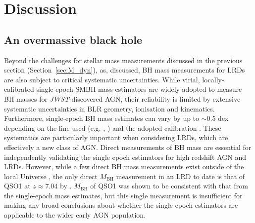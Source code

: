 \documentclass[fleqn,usenatbib]{mnras}
\newcommand{\jwst}{\textit{JWST}\xspace}
\newcommand{\Halpha}{\text{H\textalpha}\xspace}
\newcommand{\Hbeta}{\text{H\textbeta}\xspace}
\newcommand{\cliff}{\textit{The Cliff}\xspace}
\begin{document}
\section{Discussion}\label{sec:Discussion}



\subsection{An overmassive black hole}\label{sec:overmassive}

Beyond the challenges for stellar mass measurements discussed in the previous section (Section~\ref{sec:M_dyn}), as, discussed, BH mass measurements for LRDs are also subject to critical systematic uncertainties. 
While virial, locally-calibrated single-epoch SMBH mass estimators are widely adopted to measure BH masses for \jwst-discovered AGN, their reliability is limited by extensive systematic uncertainties in BLR geometry, ionisation and kinematics. 
Furthermore, single-epoch BH mass estimates can vary by up to $\sim0.5$ dex depending on the line used (e.g. \Halpha, \Hbeta) and the adopted calibration \citep[e.g.][]{DallaBonta2025}. 
These systematics are particularly important when considering LRDs, which are effectively a new class of AGN. 
Direct measurements of BH mass are essential for independently validating the single epoch estimators for high redshift AGN and LRDs.
However, while a few direct BH mass measurements exist outside of the local Universe \citep[e.g.][]{Abuter2024, Shen2024, Liao2025, GRAVITYcollab2026}, the only direct $M_\mathrm{BH}$ measurement in an LRD to date is that of QSO1 at $z\approx 7.04$ by \cite{Juodzbalis2025_QSO1}. 
$M_\mathrm{BH}$ of QSO1 was shown to be consistent with that from the single-epoch mass estimates, but this single measurement is insufficient for making any broad conclusions about whether the single epoch estimators are applicable to the wider early AGN population. 
\end{document}

